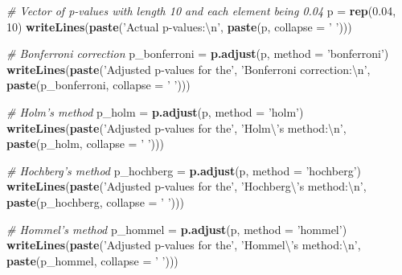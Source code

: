 \documentclass[
]{book}
\newenvironment{Shaded}{\begin{snugshade}}{\end{snugshade}}
\newcommand{\CharTok}[1]{\textcolor[rgb]{0.31,0.60,0.02}{#1}}
\newcommand{\CommentTok}[1]{\textcolor[rgb]{0.56,0.35,0.01}{\textit{#1}}}
\newcommand{\DataTypeTok}[1]{\textcolor[rgb]{0.13,0.29,0.53}{#1}}
\newcommand{\DecValTok}[1]{\textcolor[rgb]{0.00,0.00,0.81}{#1}}
\newcommand{\FloatTok}[1]{\textcolor[rgb]{0.00,0.00,0.81}{#1}}
\newcommand{\KeywordTok}[1]{\textcolor[rgb]{0.13,0.29,0.53}{\textbf{#1}}}
\newcommand{\NormalTok}[1]{#1}
\newcommand{\StringTok}[1]{\textcolor[rgb]{0.31,0.60,0.02}{#1}}
\begin{document}
\begin{Shaded}
\begin{Highlighting}[]
\CommentTok{# Vector of p-values with length 10 and each element being 0.04}
\NormalTok{p =}\StringTok{ }\KeywordTok{rep}\NormalTok{(}\FloatTok{0.04}\NormalTok{, }\DecValTok{10}\NormalTok{)}
\KeywordTok{writeLines}\NormalTok{(}\KeywordTok{paste}\NormalTok{(}\StringTok{'Actual p-values:}\CharTok{\textbackslash{}n}\StringTok{'}\NormalTok{, }\KeywordTok{paste}\NormalTok{(p, }\DataTypeTok{collapse =} \StringTok{' '}\NormalTok{)))}

\CommentTok{# Bonferroni correction}
\NormalTok{p_bonferroni =}\StringTok{ }\KeywordTok{p.adjust}\NormalTok{(p, }\DataTypeTok{method =} \StringTok{'bonferroni'}\NormalTok{)}
\KeywordTok{writeLines}\NormalTok{(}\KeywordTok{paste}\NormalTok{(}\StringTok{'Adjusted p-values for the'}\NormalTok{,}
                 \StringTok{'Bonferroni correction:}\CharTok{\textbackslash{}n}\StringTok{'}\NormalTok{,}
                 \KeywordTok{paste}\NormalTok{(p_bonferroni, }\DataTypeTok{collapse =} \StringTok{' '}\NormalTok{)))}

\CommentTok{# Holm's method}
\NormalTok{p_holm =}\StringTok{ }\KeywordTok{p.adjust}\NormalTok{(p, }\DataTypeTok{method =} \StringTok{'holm'}\NormalTok{)}
\KeywordTok{writeLines}\NormalTok{(}\KeywordTok{paste}\NormalTok{(}\StringTok{'Adjusted p-values for the'}\NormalTok{,}
                 \StringTok{'Holm}\CharTok{\textbackslash{}'}\StringTok{s method:}\CharTok{\textbackslash{}n}\StringTok{'}\NormalTok{,}
                 \KeywordTok{paste}\NormalTok{(p_holm, }\DataTypeTok{collapse =} \StringTok{' '}\NormalTok{)))}

\CommentTok{# Hochberg's method}
\NormalTok{p_hochberg =}\StringTok{ }\KeywordTok{p.adjust}\NormalTok{(p, }\DataTypeTok{method =} \StringTok{'hochberg'}\NormalTok{)}
\KeywordTok{writeLines}\NormalTok{(}\KeywordTok{paste}\NormalTok{(}\StringTok{'Adjusted p-values for the'}\NormalTok{,}
                 \StringTok{'Hochberg}\CharTok{\textbackslash{}'}\StringTok{s method:}\CharTok{\textbackslash{}n}\StringTok{'}\NormalTok{,}
                 \KeywordTok{paste}\NormalTok{(p_hochberg, }\DataTypeTok{collapse =} \StringTok{' '}\NormalTok{)))}

\CommentTok{# Hommel's method}
\NormalTok{p_hommel =}\StringTok{ }\KeywordTok{p.adjust}\NormalTok{(p, }\DataTypeTok{method =} \StringTok{'hommel'}\NormalTok{)}
\KeywordTok{writeLines}\NormalTok{(}\KeywordTok{paste}\NormalTok{(}\StringTok{'Adjusted p-values for the'}\NormalTok{,}
                 \StringTok{'Hommel}\CharTok{\textbackslash{}'}\StringTok{s method:}\CharTok{\textbackslash{}n}\StringTok{'}\NormalTok{,}
                 \KeywordTok{paste}\NormalTok{(p_hommel, }\DataTypeTok{collapse =} \StringTok{' '}\NormalTok{)))}


\end{Highlighting}
\end{Shaded}
\end{document}
